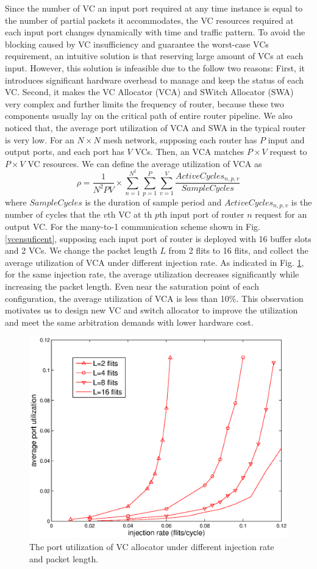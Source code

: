 \documentclass[10pt,conference]{IEEEtran}
\begin{document}
Since the number of VC an input port required at any time instance is equal to the number of partial packets it accommodates, the VC resources required at each input port changes dynamically with time and traffic pattern. To avoid the blocking caused by VC insufficiency and guarantee the worst-case VCs requirement, an intuitive solution is that reserving large amount of VCs at each input. However, this solution is infeasible due to the follow two reasons: First, it introduces significant hardware overhead to manage and keep the status of each VC. Second, it makes the VC Allocator (VCA) and SWitch Allocator (SWA) very complex and further limits the frequency of router, because these two components usually lay on the critical path of entire router pipeline. We also noticed that, the average port utilization of VCA and SWA in the typical router is very low. For an $N\times N$ mesh network, supposing each router has $P$ input and output ports, and each port has $V$ VCs. Then, an VCA matches $P\times V$ request to $P\times V$ VC resources. We can define the average utilization of VCA as
$$\rho=\frac{1}{N^2PV}\times \sum_{n=1}^{N^2}\sum_{p=1}^P\sum_{v=1}^V\frac{ActiveCycles_{n,p,v}}{SampleCycles}$$
where $SampleCycles$ is the duration of sample period and $ActiveCycles_{n,p,v}$ is the number of cycles that the $v$th VC at th $p$th input port of router $n$ request for an output VC. For the many-to-1 communication scheme shown in Fig. \ref{vcensuficent}, supposing each input port of router is deployed with 16 buffer slots and 2 VCs. We change the packet length $L$ from 2 flits to 16 flits, and collect the average utilization of VCA under different injection rate. As indicated in Fig. \ref{utilization}, for the same injection rate, the average utilization decreases significantly while increasing the packet length. Even near the saturation point of each configuration, the average utilization of VCA is less than 10\%. This observation motivates us to design new VC and switch allocator to improve the utilization and meet the same arbitration demands with lower hardware cost.
\begin{figure}
\centering\includegraphics[scale=0.5]{figures/util.eps}
\caption{The port utilization of VC allocator under different injection rate and packet length.}\label{utilization}
\end{figure}
\end{document}
